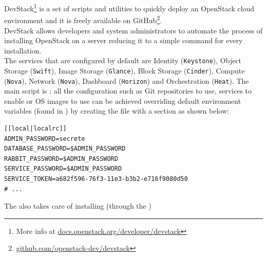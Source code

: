  
DevStack\footnote{More info at \url{docs.openstack.org/developer/devstack}} is a set of scripts and utilities to quickly deploy an OpenStack cloud environment and it is freely available on GitHub\footnote{\url{github.com/openstack-dev/devstack}}.\\
DevStack allows developers and system administrators to automate the process of installing OpenStack on a server reducing it to a simple command for every installation.\\
The services that are configured by default are Identity (\texttt{Keystone}), Object Storage (\texttt{Swift}), Image Storage (\texttt{Glance}), Block Storage (\texttt{Cinder}), Compute (\texttt{Nova}), Network (\texttt{Nova}), Dashboard (\texttt{Horizon}) and Orchestration (\texttt{Heat}).
The main script is ; all the configuration such as Git repositories to use, services to enable or OS images to use can be achieved overriding default environment variables (found in ) by creating the file  with a  section as shown below:
\begin{lstlisting}[numbers=none]
[[local|localrc]]
ADMIN_PASSWORD=secrete
DATABASE_PASSWORD=$ADMIN_PASSWORD
RABBIT_PASSWORD=$ADMIN_PASSWORD
SERVICE_PASSWORD=$ADMIN_PASSWORD
SERVICE_TOKEN=a682f596-76f3-11e3-b3b2-e716f9080d50
# ...
\end{lstlisting}
The  also takes care of installing (through the )


